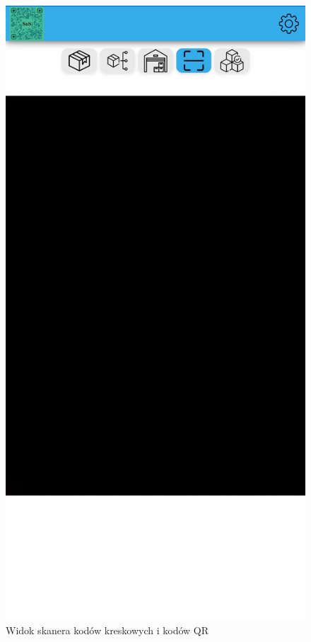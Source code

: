 \documentclass[../main.tex]{subfiles}
\begin{document}
            \begin{figure}[H]
                \centering
                \includegraphics[height=\getImageHeight]{images/app-mobile/app-scanner-mobile.jpg}
                \caption{Widok skanera kodów kreskowych i kodów QR}
                \label{fig:app-scanner-mobile}
            \end{figure}
\end{document}
